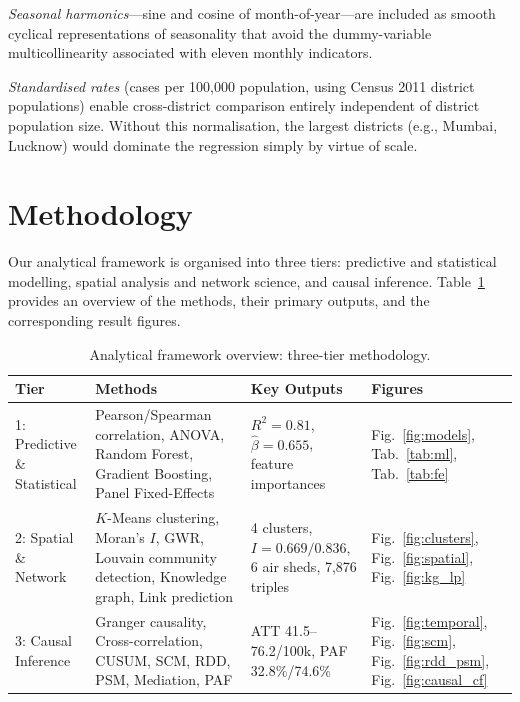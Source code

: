 \documentclass{article}
\begin{document}
\emph{Seasonal harmonics}---sine and cosine of month-of-year---are included as smooth
cyclical representations of seasonality that avoid the dummy-variable multicollinearity
associated with eleven monthly indicators.

\emph{Standardised rates} (cases per 100,000 population, using Census 2011 district
populations) enable cross-district comparison entirely independent of district population
size. Without this normalisation, the largest districts (e.g., Mumbai, Lucknow) would
dominate the regression simply by virtue of scale.

\section{Methodology}
\label{sec:methods}

Our analytical framework is organised into three tiers: predictive and statistical
modelling, spatial analysis and network science, and causal inference. Table~\ref{tab:methods}
provides an overview of the methods, their primary outputs, and the corresponding result
figures.

\begin{table}[ht]
  \caption{Analytical framework overview: three-tier methodology.}
  \label{tab:methods}
  \centering
  \small
  \begin{tabular}{lp{5cm}p{4cm}l}
    \toprule
    Tier & Methods & Key Outputs & Figures \\
    \midrule
    1: Predictive \& Statistical & Pearson/Spearman correlation, ANOVA, Random Forest, Gradient Boosting, Panel Fixed-Effects & $R^2=0.81$, $\hat{\beta}=0.655$, feature importances & Fig.~\ref{fig:models}, Tab.~\ref{tab:ml}, Tab.~\ref{tab:fe} \\[4pt]
    2: Spatial \& Network & $K$-Means clustering, Moran's $I$, GWR, Louvain community detection, Knowledge graph, Link prediction & 4 clusters, $I=0.669/0.836$, 6 air sheds, 7,876 triples & Fig.~\ref{fig:clusters}, Fig.~\ref{fig:spatial}, Fig.~\ref{fig:kg_lp} \\[4pt]
    3: Causal Inference & Granger causality, Cross-correlation, CUSUM, SCM, RDD, PSM, Mediation, PAF & ATT 41.5--76.2/100k, PAF 32.8\%/74.6\% & Fig.~\ref{fig:temporal}, Fig.~\ref{fig:scm}, Fig.~\ref{fig:rdd_psm}, Fig.~\ref{fig:causal_cf} \\
    \bottomrule
  \end{tabular}
\end{table}
\end{document}
